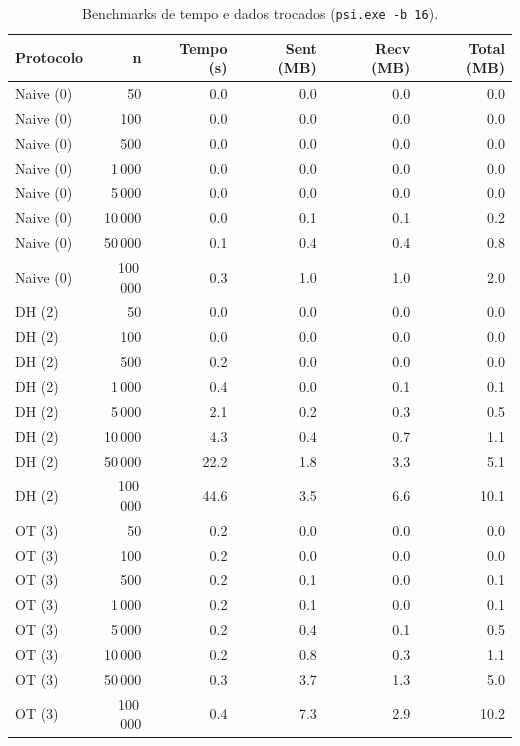 \begin{table}[H]
\centering
\caption{Benchmarks de tempo e dados trocados (\texttt{psi.exe -b 16}).}
\label{tab:bench}
\renewcommand{\arraystretch}{1.15}
\begin{tabular}{lrrrrr}
\toprule
\textbf{Protocolo} & \textbf{n} & \textbf{Tempo (s)} & \textbf{Sent (MB)} & \textbf{Recv (MB)} & \textbf{Total (MB)} \\
\midrule
Naive (0) & 50      & 0.0  & 0.0 & 0.0 & 0.0 \\
Naive (0) & 100     & 0.0  & 0.0 & 0.0 & 0.0 \\
Naive (0) & 500     & 0.0  & 0.0 & 0.0 & 0.0 \\
Naive (0) & 1\,000  & 0.0  & 0.0 & 0.0 & 0.0 \\
Naive (0) & 5\,000  & 0.0  & 0.0 & 0.0 & 0.0 \\
Naive (0) & 10\,000 & 0.0  & 0.1 & 0.1 & 0.2 \\
Naive (0) & 50\,000 & 0.1  & 0.4 & 0.4 & 0.8 \\
Naive (0) & 100\,000 & 0.3 & 1.0 & 1.0 & 2.0 \\
\midrule
DH (2)    & 50      & 0.0  & 0.0 & 0.0 & 0.0 \\
DH (2)    & 100     & 0.0  & 0.0 & 0.0 & 0.0 \\
DH (2)    & 500     & 0.2  & 0.0 & 0.0 & 0.0 \\
DH (2)    & 1\,000  & 0.4  & 0.0 & 0.1 & 0.1 \\
DH (2)    & 5\,000  & 2.1  & 0.2 & 0.3 & 0.5 \\
DH (2)    & 10\,000 & 4.3  & 0.4 & 0.7 & 1.1 \\
DH (2)    & 50\,000 & 22.2 & 1.8 & 3.3 & 5.1 \\
DH (2)    & 100\,000 & 44.6 & 3.5 & 6.6 & 10.1 \\
\midrule
OT (3)    & 50      & 0.2  & 0.0 & 0.0 & 0.0 \\
OT (3)    & 100     & 0.2  & 0.0 & 0.0 & 0.0 \\
OT (3)    & 500     & 0.2  & 0.1 & 0.0 & 0.1 \\
OT (3)    & 1\,000  & 0.2  & 0.1 & 0.0 & 0.1 \\
OT (3)    & 5\,000  & 0.2  & 0.4 & 0.1 & 0.5 \\
OT (3)    & 10\,000 & 0.2  & 0.8 & 0.3 & 1.1 \\
OT (3)    & 50\,000 & 0.3  & 3.7 & 1.3 & 5.0 \\
OT (3)    & 100\,000 & 0.4 & 7.3 & 2.9 & 10.2 \\
\bottomrule
\end{tabular}
\renewcommand{\arraystretch}{1.0}
\end{table}

